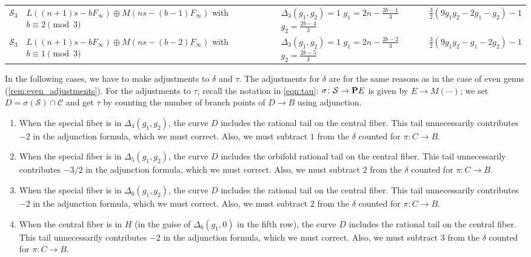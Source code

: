 \documentclass{amsart}
\renewcommand {\P}{{\bf P}}
\newcommand {\from}{{\colon}}
\newcommand{\orb}[1]{{\mathcal #1}}     %
\begin{document}
\begin{longtable}{| l | p{} | p{} | p{} |}
$\orb S_3$ &
$L((n+1)s - bF_\infty) \oplus M(ns-(b-1)F_\infty)$\newline
with $b \equiv 2 \pmod 3$&
$\Delta_3(g_1,g_2) = 1$\newline
$g_1 = 2n-\frac{2b-1}{3}$\newline
$g_2 = \frac{2b - 4}{3}$ &
$\frac{3}{2}(9g_1g_2-2g_1-g_2)-1$
\\

$\orb S_3$ &
$L((n+1)s - bF_\infty) \oplus M(ns-(b-2)F_\infty)$\newline
with $b \equiv 1 \pmod 3$&
$\Delta_3(g_1,g_2) = 1$\newline
$g_1 = 2n-\frac{2b-2}{3}$\newline
$g_2 = \frac{2b - 5}{3}$ &
$\frac{3}{2}(9g_1g_2-g_1-2g_2)-1$
\label{table:test-curves-tau}
\end{longtable}
\begin{remark}\label{rem:odd_adjustments}
  In the following cases, we have to make adjustments to $\delta$ and
  $\tau$. The adjustments for $\delta$ are for the same reasons as in
  the case of even genus (\autoref{rem:even_adjustments}). For the
  adjustments to $\tau$, recall the notation in \eqref{eqn:tau}:
  $\sigma \from \orb S \to \P E$ is given by $E \to M(\cdots)$; we set
  $D = \sigma(\orb S) \cap \orb C$ and get $\tau$ by counting the
  number of branch points of $D \to B$ using adjunction.
  \begin{enumerate}
  \item When the special fiber is in $\Delta_4(g_1,g_2)$, the curve
    $D$ includes the rational tail on the central fiber. This tail
    unnecessarily contributes $-2$ in the adjunction formula,
    which we must correct. Also, we must subtract $1$ from the
    $\delta$ counted for $\pi \from C \to B$.
  \item When the special fiber is in $\Delta_5(g_1,g_2)$, the curve
    $D$ includes the orbifold rational tail on the central fiber. This
    tail unnecessarily contributes $-3/2$ in the adjunction formula,
    which we must correct. Also, we must subtract $2$ from the
    $\delta$ counted for $\pi \from C \to B$.
  \item When the special fiber is in $\Delta_6(g_1,g_2)$, the curve
    $D$ includes the rational tail on the central fiber. This
    tail unnecessarily contributes $-2$ in the adjunction formula,
    which we must correct. Also, we must subtract $2$ from the
    $\delta$ counted for $\pi \from C \to B$.
  \item When the central fiber is in $H$ (in the guise of
    $\Delta_6(g_1,0)$ in the fifth row), the curve $D$ includes the
    rational tail on the central fiber. This tail unnecessarily
    contributes $-2$ in the adjunction formula, which we must
    correct. Also, we must subtract $3$ from the $\delta$ counted for
    $\pi \from C \to B$.
  \end{enumerate}
\end{remark}
\end{document}
